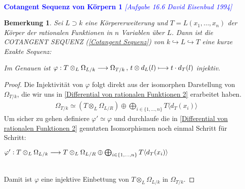 \documentclass[10pt,a4paper]{report}
\newcommand{\comment}[1]{}
\newcommand{\ModulsOfDifferenzials}{David Eisenbud 1994}
\newcounter{Aussage}[chapter]
\newtheorem{bem}[Aussage]{Bemerkung}
\newcommand{\functionfront}[3]{\nolinebreak{#1:#2 \longrightarrow #3}}
\newcommand{\function}[5]{\nolinebreak{#1:#2 \longrightarrow #3 \, , \, #4 \longmapsto #5}}
\newcommand{\divR}[2]{\Omega_{#1/#2}}
\newcommand{\divf}[1]{d_{#1}}
\newcommand{\Tensor}[3]{#1 \otimes_{#2} #3}
\newcommand{\tensor}[3]{#1 \otimes #3}
\newcommand{\Verz}[1]{\langle #1 \rangle}
\begin{document}
\ \\
\textcolor{blue}{\textbf{Cotangent Sequenz von Körpern 1} \textit{[Aufgabe 16.6 \ModulsOfDifferenzials]}}
\begin{bem} \comment{\label{Cotangent Sequenz von Körpern 1}}
Sei $L \supset k$ eine Körpererweiterung und $T = L(x_1, \dots ,x_n)$ der Körper der rationalen Funktionen in $n$ Variablen über $L$. Dann ist die COTANGENT SEQUENZ \textit{(\cref{Cotangent Sequenz})} von $k \hookrightarrow L \hookrightarrow T$ eine kurze Exakte Sequenz:
\begin{center}
\end{center}
Im Genauen ist $\function{\varphi}{\Tensor{T}{L}{\divR{L}{k}}}{\divR{T}{k}}{\tensor{t}{L}{\divf{L}(l)}}{t \cdot \divf{T}(l)}$ injektiv.
\end{bem}
\begin{proof}
Die Injektivität von $\varphi$ folgt direkt aus der isomorphen Darstellung von $\divR{T}{k}$, die wir uns in \cref{Differential von rationalen Funktionen 2} erarbeitet haben.
\begin{gather*}
\divR{T}{k} \simeq (\Tensor{T}{L}{\divR{L}{R}}) \oplus \bigoplus_{i \in \lbrace 1,\dots,n \rbrace} T \Verz{\divf{T}(x_i)}
\end{gather*}
Um sicher zu gehen definiere $\varphi' \simeq \varphi$ und durchlaufe die in \cref{Differential von rationalen Funktionen 2} genutzten Isomorphismen noch einmal Schritt für Schritt:
\begin{center}
$\functionfront{\varphi'}{\Tensor{T}{L}{\divR{L}{k}}}{\Tensor{T}{L}{\divR{L}{R}} \oplus \bigoplus_{i \in \lbrace 1,\dots,n \rbrace} T \Verz{\divf{T}(x_i)}}$\\
\ \\
\end{center}
Damit ist $\varphi$ eine injektive Einbettung von $\Tensor{T}{L}{\divR{L}{k}}$ in $\divR{T}{k}$.
\end{proof}
\end{document}
